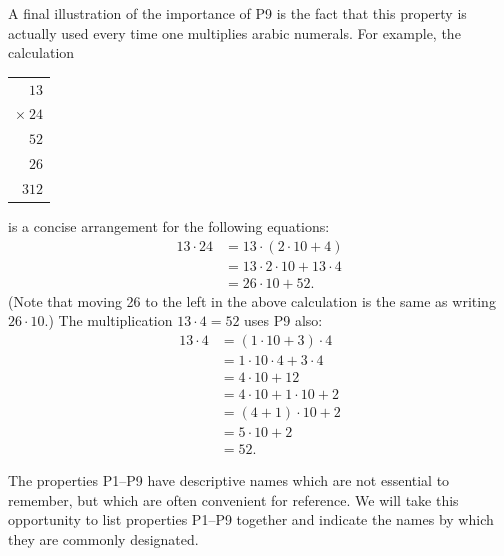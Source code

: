 A final illustration of the importance of P9 is the fact that this property
is actually used every time one multiplies arabic numerals. For example, the
calculation
\begin{center}
\begin{tabular}{r}
$13$\\
$\times\ 24$\\ \hline
$52$\\
$26$\\ \hline
$312$
\end{tabular}
\end{center}
is a concise arrangement for the following equations:
\begin{align*}
13 \cdot 24 &= 13 \cdot (2 \cdot 10 + 4)\\
&= 13 \cdot 2 \cdot 10 + 13 \cdot 4\\
&= 26 \cdot 10 + 52.
\end{align*}
(Note that moving 26 to the left in the above calculation is the same as
writing $26 \cdot 10$.) The multiplication $13 \cdot 4 = 52$ uses P9 also:
\begin{align*}
13 \cdot 4 &= (1 \cdot 10 + 3) \cdot 4\\
&= 1 \cdot 10 \cdot 4 + 3 \cdot 4\\
&= 4 \cdot 10 + 12\\
&= 4 \cdot 10 + 1 \cdot 10 + 2\\
&= (4+1) \cdot 10 + 2\\
&= 5 \cdot 10 + 2\\
&= 52.
\end{align*}

The properties P1--P9 have descriptive names which are not essential to
remember, but which are often convenient for reference. We will take this
opportunity to list properties P1--P9 together and indicate the names by
which they are commonly designated.

